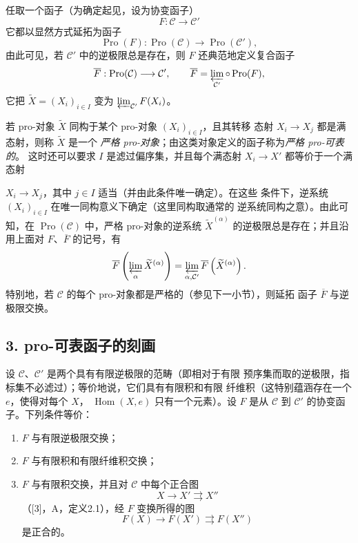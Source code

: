 任取一个函子（为确定起见，设为协变函子）
\[
  F:\mathcal C\longrightarrow\mathcal C'
\]
它都以显然方式延拓为函子
\[
  \operatorname{Pro}(F):\operatorname{Pro}(\mathcal C)
  \longrightarrow\operatorname{Pro}(\mathcal C'),
\]
由此可见，若 $\mathcal C'$ 中的逆极限总是存在，则 $F$ 还典范地定义复合函子
\[
  \overline F:\operatorname{Pro}(\mathcal C)\longrightarrow\mathcal C',
  \qquad
  \overline F=\varprojlim_{\mathcal C'}\circ\operatorname{Pro}(F),
\]
它把 $\widetilde X=(X_i)_{i\in I}$ 变为
$\varprojlim_{\mathcal C'}F(X_i)$。

若 pro-对象 $\widetilde X$ 同构于某个 pro-对象 $(X_i)_{i\in I}$，且其转移
态射 $X_i\longrightarrow X_j$ 都是满态射，则称 $\widetilde X$ 是一个
\emph{严格 pro-对象}；由这类对象定义的函子称为\emph{严格 pro-可表的}。
这时还可以要求 $I$ 是滤过偏序集，并且每个满态射
$X_i\longrightarrow X'$ 都等价于一个满态射

$X_i\longrightarrow X_j$，其中 $j\in I$ 适当（并由此条件唯一确定）。在这些
条件下，逆系统 $(X_i)_{i\in I}$ 在唯一同构意义下确定（这里同构取通常的
逆系统同构之意）。由此可知，在 $\operatorname{Pro}(\mathcal C)$ 中，严格
pro-对象的逆系统 $\widetilde X^{(\alpha)}$ 的逆极限总是存在；并且沿用上面对
$F$、$\overline F$ 的记号，有
\[
  \overline F\left(\varprojlim_\alpha\widetilde X^{(\alpha)}\right)
  =\varprojlim_{\alpha,\mathcal C'}
  \overline F\left(\widetilde X^{(\alpha)}\right).
\]
特别地，若 $\mathcal C$ 的每个 pro-对象都是严格的（参见下一小节），则延拓
函子 $\overline F$ 与逆极限交换。

\subsection*{3. pro-可表函子的刻画}

设 $\mathcal C$、$\mathcal C'$ 是两个具有有限逆极限的范畴（即相对于有限
预序集而取的逆极限，指标集不必滤过）；等价地说，它们具有有限积和有限
纤维积（这特别蕴涵存在一个 $e$，使得对每个 $X$，
$\operatorname{Hom}(X,e)$ 只有一个元素）。设 $F$ 是从 $\mathcal C$ 到
$\mathcal C'$ 的协变函子。下列条件等价：

\begin{enumerate}
\item[(i)] $F$ 与有限逆极限交换；
\item[(ii)] $F$ 与有限积和有限纤维积交换；
\item[(iii)] $F$ 与有限积交换，并且对 $\mathcal C$ 中每个正合图
\[
  X\longrightarrow X'\rightrightarrows X''
\]
（[3]，A，定义2.1），经 $F$ 变换所得的图
\[
  F(X)\longrightarrow F(X')\rightrightarrows F(X'')
\]
是正合的。
\end{enumerate}

